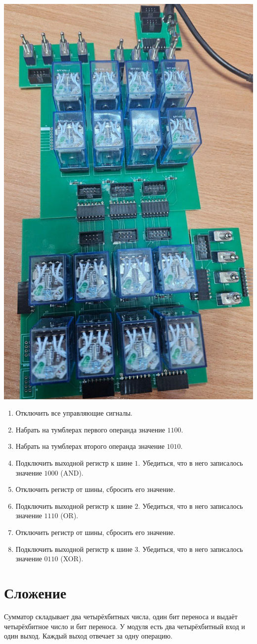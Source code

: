 \documentclass{book}
\begin{document}
\includegraphics[width=0.5\columnwidth]{photo/logic.jpg}

\begin{enumerate}
    \item Отключить все управляющие сигналы.
    \item Набрать на тумблерах первого операнда значение $1100$.
    \item Набрать на тумблерах второго операнда значение $1010$.
    \item Подключить выходной регистр к шине $1$. Убедиться, что в него записалось значение $1000$ (AND).
    \item Отключить регистр от шины, сбросить его значение.
    \item Подключить выходной регистр к шине $2$. Убедиться, что в него записалось значение $1110$ (OR).
    \item Отключить регистр от шины, сбросить его значение.
    \item Подключить выходной регистр к шине $3$. Убедиться, что в него записалось значение $0110$ (XOR).
\end{enumerate}


\section{Сложение}

Сумматор складывает два четырёхбитных числа, один бит переноса и выдаёт четырёхбитное число и бит переноса.
У модуля есть два четырёхбитный вход и один выход.
Каждый выход отвечает за одну операцию.
\end{document}
